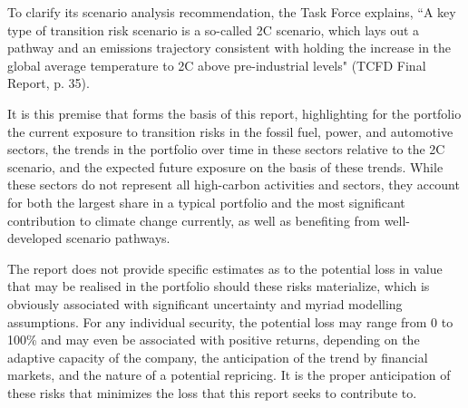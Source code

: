 \documentclass[10pt,table,a4]{article}\usepackage[]{graphicx}\usepackage[]{color}
\begin{document}
\begin{multicols}{2}
		To clarify its scenario analysis recommendation, the Task Force explains, ``A key type of transition risk scenario is a so-called 2\degree C scenario, which lays out a pathway and an emissions trajectory consistent with holding the increase in the global average temperature to 2\degree C above pre-industrial levels" (TCFD Final Report, p. 35).
		
		It is this premise that forms the basis of this report, highlighting for the portfolio the current exposure to transition risks in the fossil fuel, power, and automotive sectors, the trends in the portfolio over time in these sectors relative to the 2\degree C scenario, and the expected future exposure on the basis of these trends. While these sectors do not represent all high-carbon activities and sectors, they account for both the largest share in a typical portfolio and the most significant contribution to climate change currently, as well as benefiting from well-developed scenario pathways.
		
		The report does not provide specific estimates as to the potential loss in value that may be realised in the portfolio should these risks materialize, which is obviously associated with significant uncertainty and myriad modelling assumptions. For any individual security, the potential loss may range from 0 to 100\% and may even be associated with positive returns, depending on the adaptive capacity of the company, the anticipation of the trend by financial markets, and the nature of a potential repricing. It is the proper anticipation of these risks that minimizes the loss that this report seeks to contribute to. 
		
		
		
	\end{multicols}
	
\end{document}
